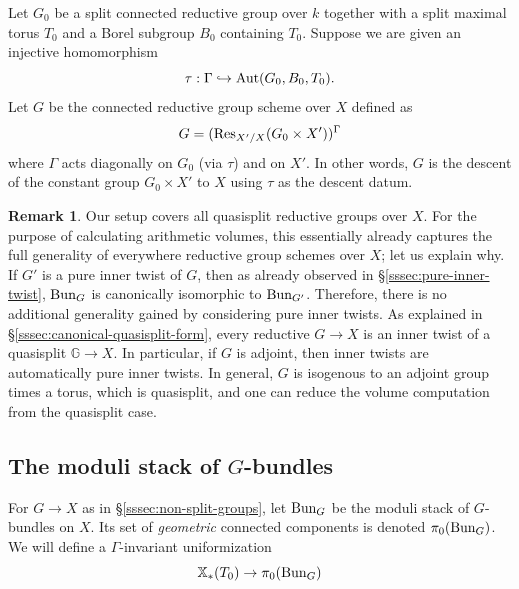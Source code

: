 \documentclass[reqno]{amsart}
\numberwithin{equation}{subsection}
\theoremstyle{definition}
\newtheorem{remark}[subsubsection]{Remark}
\def\GG{\mathbb{G}}
\newcommand{\Bun}{\textup{Bun}}
\newcommand{\Res}{\textup{Res}}
\newcommand\Aut{\textup{Aut}}
\newcommand\xcoch{\mathbb{X}_*}
\newcommand\G\Gamma
\renewcommand{\t}{\tau}
\newcommand{\inj}{\hookrightarrow}
\begin{document}
Let $G_{0}$ be a split connected reductive group over $k$ together with a split maximal torus $T_{0}$ and a Borel subgroup $B_{0}$ containing $T_{0}$. Suppose we are given an injective homomorphism
\begin{equation*}
\t: \G\inj \Aut(G_{0}, B_{0}, T_{0}).
\end{equation*}
Let $G$ be the connected reductive group scheme over $X$ defined as 
\begin{equation*}
G=(\Res_{X'/X}(G_{0}\times X'))^{\G}
\end{equation*}
where $\G$ acts diagonally on $G_{0}$ (via $\t$) and on $X'$. In other words, $G$ is the descent of the constant group $G_{0}\times X'$ to $X$ using $\t$ as the descent datum. 

\begin{remark}\label{rem:beyond-quasisplit} Our setup covers all quasisplit reductive groups over $X$. For the purpose of calculating arithmetic volumes, this essentially already captures the full generality of everywhere reductive group schemes over $X$; let us explain why. If $G'$ is a pure inner twist of $G$, then as already observed in \S \ref{sssec:pure-inner-twist}, $\Bun_G$ is canonically isomorphic to $\Bun_{G'}$. Therefore, there is no additional generality gained by considering pure inner twists. As explained in \S \ref{sssec:canonical-quasisplit-form}, every reductive $G \rightarrow X$ is an inner twist of a quasisplit $\GG \rightarrow X$. In particular, if $G$ is adjoint, then inner twists are automatically pure inner twists. In general, $G$ is isogenous to an adjoint group times a torus, which is quasisplit, and one can reduce the volume computation from the quasisplit case. 
\end{remark}



\subsection{The moduli stack of $G$-bundles} 
For $G \rightarrow X$ as in \S \ref{sssec:non-split-groups}, let $\Bun_G$ be the moduli stack of $G$-bundles on $X$. Its  set of \emph{geometric} connected components is denoted $\pi_{0}(\Bun_{G})$. We will define a $\Gamma$-invariant uniformization
\begin{equation*}
\xcoch(T_{0})\to \pi_{0}(\Bun_{G})
\end{equation*}
\end{document}
